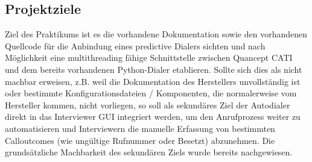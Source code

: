 \subsection{Projektziele}
Ziel des Praktikums ist es die vorhandene Dokumentation sowie den vorhandenen Quellcode für die Anbindung eines predictive Dialers sichten und nach Möglichkeit eine multithreading fähige Schnittstelle zwischen Quancept CATI und dem bereits vorhandenen Python-Dialer etablieren. Sollte sich dies als nicht machbar erweisen, z.B. weil die Dokumentation des Herstellers unvollständig ist oder bestimmte Konfigurationsdateien / Komponenten, die normalerweise vom Hersteller kommen, nicht vorliegen, so soll als sekundäres Ziel der Autodialer direkt in das Interviewer GUI integriert werden, um den Anrufprozess weiter zu automatisieren und Interviewern die manuelle Erfassung von bestimmten Calloutcomes (wie ungültige Rufnummer oder Besetzt) abzunehmen. Die grundsätzliche Machbarkeit des sekundären Ziels wurde bereits nachgewiesen.  

%


